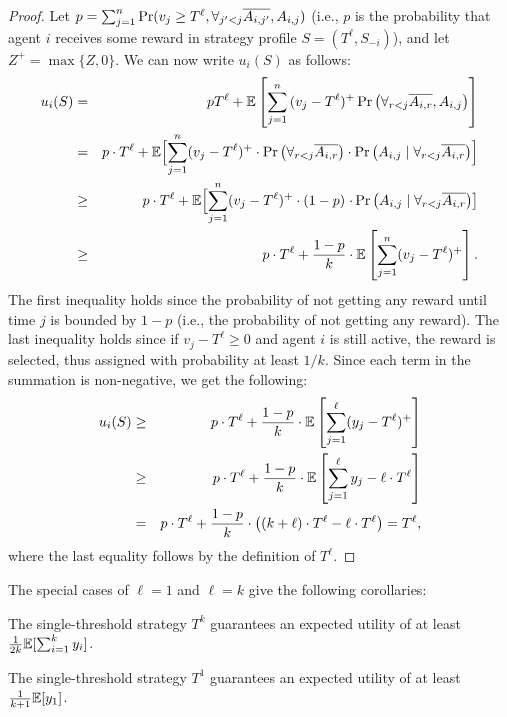 \begin{proof}
Let $p=\sum_{j=1}^{n} \Pr(v_j\geq T^\ell,\forall_{j'<j}  \overline{A_{i,j'}},A_{i,j})$ (i.e., $p$ is the probability that agent $i$ receives some reward in strategy profile $S=(T^{\ell},S_{-i})$), and let $Z^{+}=\max\{Z,0\}$.
We can now write $u_i(S)$ as follows:
\begin{eqnarray*}
	u_i(S) 	& =  &p T^\ell + \mathbb{E}\left[\sum_{j=1}^{n}{(v_j-T^\ell)^+\Pr\left(\forall_{r<j}\overline{A_{i,r}},A_{i,j}\right)}\right]  \nonumber\\
	 &= & p\cdot T^\ell  + \mathbb{E}\Bigl[\sum_{j=1}^{n}(v_j-T^\ell)^+ \cdot \Pr\left(\forall_{r<j}\overline{A_{i,r}} \right)   \cdot\Pr\left(A_{i,j} \mid \forall_{r<j}\overline{A_{i,r}}\right)\Bigr] \nonumber\\
	 &\geq &	 p\cdot T^\ell + \mathbb{E}\Bigl[\sum_{j=1}^{n}(v_j-T^\ell)^+\cdot (1-p) \Bigr. \left. \cdot \Pr\left(A_{i,j} \mid \forall_{r<j}\overline{A_{i,r}}\right)\right] \nonumber\\
	 &\geq  &  p\cdot T^\ell +\frac{1-p}{k}\cdot \mathbb{E}\left[\sum_{j=1}^{n}(v_j-T^\ell)^{+}\right]. \nonumber 
\end{eqnarray*}		
The first inequality holds since the probability of not getting any reward until time $j$ is bounded by $1-p$ (i.e., the probability of not getting any reward). 
The last inequality holds since if $v_j-T^\ell\geq 0$ and agent $i$ is still active, the reward is selected, thus assigned with probability at least $1/k$. 
Since each term in the summation is non-negative, we get the following:
\begin{eqnarray*}		
	u_i(S)	& \geq & p\cdot T^\ell +\frac{1-p}{k}\cdot \mathbb{E}\left[\sum_{j=1}^{\ell}(y_j-T^\ell)^{+}\right] \nonumber \\ 
		& \geq  &p\cdot T^\ell + \frac{1-p}{k}\cdot \mathbb{E}\left[\sum_{j=1}^{\ell}y_j-\ell\cdot  T^\ell\right] \nonumber\\
		& =  &p\cdot T^\ell + \frac{1-p}{k}\cdot \left((k+\ell)\cdot T^\ell-\ell \cdot T^\ell\right)  = T^{\ell},\nonumber
\end{eqnarray*}
where the last equality follows by the definition of $T^\ell$.
\end{proof}

The special cases of $\ell=1$ and $\ell=k$ give the following corollaries:
\begin{corollary}
	The single-threshold strategy $T^k$ guarantees an expected utility of at least $\frac{1}{2k}\mathbb{E}[\sum_{i=1}^{k}y_i]$. 
\end{corollary}
\begin{corollary}
	The single-threshold strategy $T^1$ guarantees an expected utility of at least $\frac{1}{k+1}\mathbb{E}[y_1]$.
\end{corollary}

